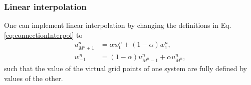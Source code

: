 \subsubsection{Linear interpolation}
One can implement linear interpolation by changing the definitions in Eq. \eqref{eq:connectionInterpol} to
\begin{subequations}\label{eq:linearConnInterpol}
    \begin{align}
            u_{M^n+1}^n &= \alpha w_0^n + (1-\alpha)w_1^n,\label{eq:linearVirtU}\\
            w_{-1}^n &= (1-\alpha)u_{M^n-1}^n + \alpha u_{M^n}^n,
    \end{align}
\end{subequations}
such that the value of the virtual grid points of one system are fully defined by values of the other. 

